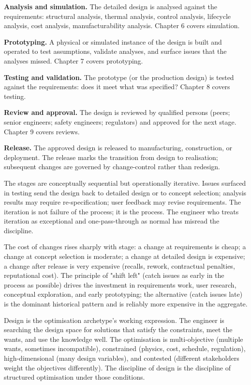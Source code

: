 \textbf{Analysis and simulation.} The detailed design is analysed against the requirements: structural analysis, thermal analysis, control analysis, lifecycle analysis, cost analysis, manufacturability analysis. Chapter 6 covers simulation.

\textbf{Prototyping.} A physical or simulated instance of the design is built and operated to test assumptions, validate analyses, and surface issues that the analyses missed. Chapter 7 covers prototyping.

\textbf{Testing and validation.} The prototype (or the production design) is tested against the requirements: does it meet what was specified? Chapter 8 covers testing.

\textbf{Review and approval.} The design is reviewed by qualified persons (peers; senior engineers; safety engineers; regulators) and approved for the next stage. Chapter 9 covers reviews.

\textbf{Release.} The approved design is released to manufacturing, construction, or deployment. The release marks the transition from design to realisation; subsequent changes are governed by change-control rather than redesign.

The stages are conceptually sequential but operationally iterative. Issues surfaced in testing send the design back to detailed design or to concept selection; analysis results may require re-specification; user feedback may revise requirements. The iteration is not failure of the process; it is the process. The engineer who treats iteration as exceptional and one-pass-through as normal has misread the discipline.

The cost of changes rises sharply with stage: a change at requirements is cheap; a change at concept selection is moderate; a change at detailed design is expensive; a change after release is very expensive (recalls, rework, contractual penalties, reputational cost). The principle of "shift left" (catch issues as early in the process as possible) drives the investment in requirements work, user research, conceptual exploration, and early prototyping; the alternative (catch issues late) is the dominant historical pattern and is reliably more expensive in the aggregate.

\begin{archetype}[optimisation]
Design is the optimisation archetype's working expression. The engineer is searching the design space for solutions that satisfy the constraints, meet the wants, and use the knowledge well. The optimisation is multi-objective (multiple wants, sometimes incompatible), constrained (physics, cost, schedule, regulation), high-dimensional (many design variables), and contested (different stakeholders weight the objectives differently). The discipline of design is the discipline of structured optimisation under those conditions.
\end{archetype}

